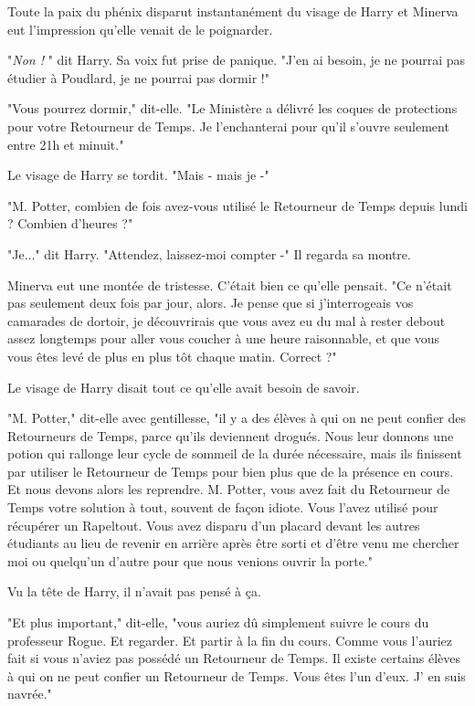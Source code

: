Toute la paix du phénix disparut instantanément du visage de Harry et Minerva eut l'impression qu'elle venait de le poignarder.

"\emph{Non !} " dit Harry. Sa voix fut prise de panique. "J'en ai besoin, je ne pourrai pas étudier à Poudlard, je ne pourrai pas dormir !"

"Vous pourrez dormir," dit-elle. "Le Ministère a délivré les coques de protections pour votre Retourneur de Temps. Je l'enchanterai pour qu'il s'ouvre seulement entre 21h et minuit."

Le visage de Harry se tordit. "Mais - mais je -"

"M. Potter, combien de fois avez-vous utilisé le Retourneur de Temps depuis lundi ? Combien d'heures ?"

"Je..." dit Harry. "Attendez, laissez-moi compter -" Il regarda sa montre.

Minerva eut une montée de tristesse. C'était bien ce qu'elle pensait. "Ce n'était pas seulement deux fois par jour, alors. Je pense que si j'interrogeais vos camarades de dortoir, je découvrirais que vous avez eu du mal à rester debout assez longtemps pour aller vous coucher à une heure raisonnable, et que vous vous êtes levé de plus en plus tôt chaque matin. Correct ?"

Le visage de Harry disait tout ce qu'elle avait besoin de savoir.

"M. Potter," dit-elle avec gentillesse, "il y a des élèves à qui on ne peut confier des Retourneurs de Temps, parce qu'ils deviennent drogués. Nous leur donnons une potion qui rallonge leur cycle de sommeil de la durée nécessaire, mais ils finissent par utiliser le Retourneur de Temps pour bien plus que de la présence en cours. Et nous devons alors les reprendre. M. Potter, vous avez fait du Retourneur de Temps votre solution à tout, souvent de façon idiote. Vous l'avez utilisé pour récupérer un Rapeltout. Vous avez disparu d'un placard devant les autres étudiants au lieu de revenir en arrière après être sorti et d'être venu me chercher moi ou quelqu'un d'autre pour que nous venions ouvrir la porte."

Vu la tête de Harry, il n'avait pas pensé à ça.

"Et plus important," dit-elle, "vous auriez dû simplement suivre le cours du professeur Rogue. Et regarder. Et partir à la fin du cours. Comme vous l'auriez fait si vous n'aviez pas possédé un Retourneur de Temps. Il existe certains élèves à qui on ne peut confier un Retourneur de Temps. Vous êtes l'un d'eux. J' en suis navrée."

